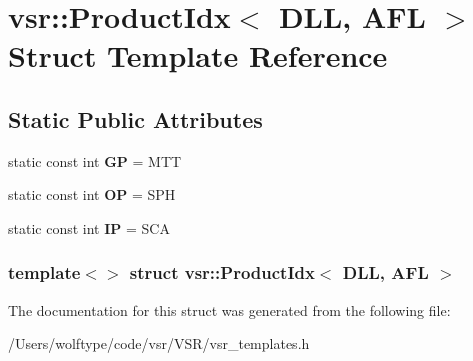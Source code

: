 \hypertarget{structvsr_1_1_product_idx_3_01_d_l_l_00_01_a_f_l_01_4}{\section{vsr\-:\-:Product\-Idx$<$ D\-L\-L, A\-F\-L $>$ Struct Template Reference}
\label{structvsr_1_1_product_idx_3_01_d_l_l_00_01_a_f_l_01_4}
}
\subsection*{Static Public Attributes}
\begin{DoxyCompactItemize}
\item 
\hypertarget{structvsr_1_1_product_idx_3_01_d_l_l_00_01_a_f_l_01_4_aa8510b3def29f0718ef2836b2c28c3de}{static const int {\bfseries G\-P} = M\-T\-T}\label{structvsr_1_1_product_idx_3_01_d_l_l_00_01_a_f_l_01_4_aa8510b3def29f0718ef2836b2c28c3de}

\item 
\hypertarget{structvsr_1_1_product_idx_3_01_d_l_l_00_01_a_f_l_01_4_a4f076220a733fd830bdaa08a627b34f4}{static const int {\bfseries O\-P} = S\-P\-H}\label{structvsr_1_1_product_idx_3_01_d_l_l_00_01_a_f_l_01_4_a4f076220a733fd830bdaa08a627b34f4}

\item 
\hypertarget{structvsr_1_1_product_idx_3_01_d_l_l_00_01_a_f_l_01_4_ae28bd3e0b79c5f1d3a17947afe2506f9}{static const int {\bfseries I\-P} = S\-C\-A}\label{structvsr_1_1_product_idx_3_01_d_l_l_00_01_a_f_l_01_4_ae28bd3e0b79c5f1d3a17947afe2506f9}

\end{DoxyCompactItemize}
\subsubsection*{template$<$$>$ struct vsr\-::\-Product\-Idx$<$ D\-L\-L, A\-F\-L $>$}



The documentation for this struct was generated from the following file\-:\begin{DoxyCompactItemize}
\item 
/\-Users/wolftype/code/vsr/\-V\-S\-R/vsr\-\_\-templates.\-h\end{DoxyCompactItemize}
